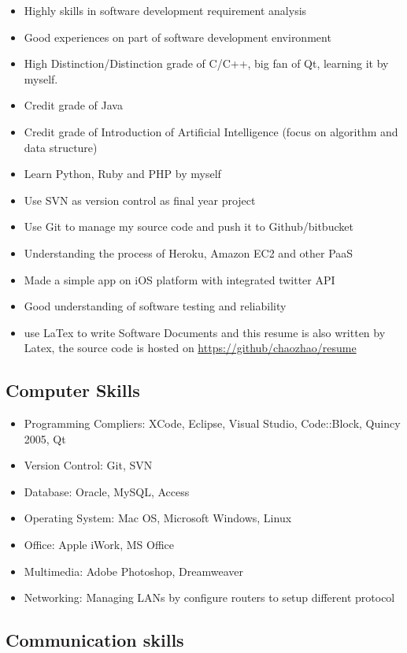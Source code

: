 \documentclass{article}
\begin{document}
	\begin{itemize}
		\item Highly skills in software development requirement analysis
		\item Good experiences on part of software development environment
		\item High Distinction/Distinction grade of C/C++, big fan of Qt, learning it by myself.
		\item Credit grade of Java
		\item Credit grade of Introduction of Artificial Intelligence (focus on algorithm and data structure)
		\item Learn Python, Ruby and PHP by myself
		\item Use SVN as version control as final year project
		\item Use Git to manage my source code and push it to Github/bitbucket
		\item Understanding the process of Heroku, Amazon EC2 and other PaaS
		\item Made a simple app on iOS platform with integrated twitter API
		\item Good understanding of software testing and reliability
		\item use LaTex to write Software Documents and this resume is also written by Latex, the source code is hosted on \url{ https://github/chaozhao/resume}
	\end{itemize}

\subsection*{Computer Skills}
	\begin{itemize}
		\item Programming Compliers: XCode, Eclipse, Visual Studio, Code::Block, Quincy 2005, Qt
		\item Version Control: Git, SVN
		\item Database: Oracle, MySQL, Access
		\item Operating System: Mac OS, Microsoft Windows, Linux
		\item Office: Apple iWork, MS Office
		\item Multimedia: Adobe Photoshop, Dreamweaver
		\item Networking: Managing LANs by configure routers to setup different protocol
	\end{itemize}
	
\subsection*{Communication skills}
	
\end{document}
